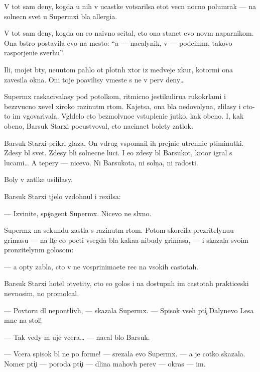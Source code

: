 \documentclass[12pt]{book}
\begin{document}
V tot sam{\yi}{\y} deny, kogda u nih v ucastke votsarilsa etot vecn{\yi}{\y} nocno{\y} polumrak — na solnecn{\yi}{\y} svet u Superm{\yi}xi b{\yi}la allergi{\y}a.

V tot sam{\yi}{\y} deny, kogda on {\y}e{\x}o naivno scital, cto ona stanet {\y}evo nov{\yi}m naparnikom. Ona b{\yi}stro postavila {\y}evo na mesto: ``{\Y}a — nacalynik, v{\yi} — podcin{\e}nn{\yi}{\y}, takovo raspor{\ia}jeni{\y}e sverhu''.

Ili, mojet b{\yi}ty, neu{\y}utom pahlo ot plotn{\yi}h xtor iz medvej{\y}e{\y} xkur{\yi}, ko\-to\-r{\yi}\-mi ona zavesila okna. Oni toje po{\y}avilisy vmeste s ne{\y} v perv{\yi}{\y} deny…

Superm{\yi}x raskacivalasy pod potolkom, ritmicno jestikuliru{\y}a ru\-ko\-kr{\yi}\-l{\y}a\-mi i bezzvucno xevel{\ia} xiroko razinut{\yi}m rtom. Kajetsa, ona b{\yi}la nedovolyna, zlilasy i cto-to im v{\yi}govarivala. V{\yi}gl{\ia}delo eto bezmolvno{\y}e v{\yi}stupleni{\y}e jutko, kak ob{\yi}cno. I, kak ob{\yi}cno, Barsuk Starxi{\y} pocustvoval, cto nacina{\y}et bolety zat{\yi}lok.

Barsuk Starxi{\y} prikr{\yi}l glaza. On vdrug vspomnil ih prejni{\y}e utrenni{\y}e p{\ia}\-ti\-mi\-nut\-ki. Zdesy b{\yi}l svet. Zdesy b{\yi}li solnecn{\yi}{\y}e luci. I {\y}e{\x}o zdesy b{\yi}l Barsukot, kotor{\yi}{\y} igral s lucami… A tepery — nicevo. Ni Barsukota, ni soln{\c}a, ni radosti.

Boly v za\-t{\yi}l\-ke usililasy.

Barsuk Starxi{\y} t{\ia}jelo vzdohnul i rexilsa:

— Izvinite, spe{\c}agent Superm{\yi}x. Nicevo ne sl{\yi}xno.

Superm{\yi}x na sekundu zast{\yi}la s razinut{\yi}m rtom. Potom skorcila pre\-zri\-tely\-nu\-{\y}u grimasu — na li{\c}e {\y}e{\y}o pocti vsegda b{\yi}la kaka{\y}a-nibudy grimasa, — i skazala svo{\y}im pronzitelyn{\yi}m golosom:

— {\Y}a op{\ia}ty zab{\yi}la, cto v{\yi} ne vosprinima{\y}ete rec na v{\yi}sokih castotah.

Barsuk Starxi{\y} hotel otvetity, cto {\y}e{\y}o golos i na dostupn{\yi}h im castotah prakticeski nev{\yi}nosim, no promolcal.

— Povtor{\ia}{\y}u dl{\ia} nepon{\ia}tliv{\yi}h, — skazala Superm{\yi}x. — Spisok vseh pti{\c} Dalynevo Lesa mne na stol!

— Tak vedy m{\yi} uje vcera… — nacal b{\yi}lo Barsuk.

— Vcera spisok b{\yi}l ne po forme! — srezala {\y}evo Superm{\yi}x. — {\Y}a je cotko skazala. Nomer pti{\c}i — poroda pti{\c}i — dlina mahov{\yi}h per{\y}ev — okras — im{\ia}.
\end{document}
